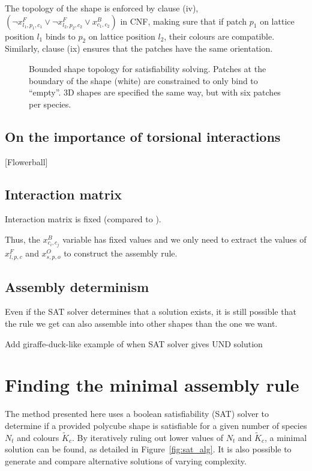 The topology of the shape is enforced by clause (iv), \(\left(\lnot x_{l_1, p_1, c_1}^{F} \lor \lnot x_{l_2, p_2, c_2}^{F} \lor x_{c_1, c_2}^{B}\right)\) in CNF, making sure that if patch \(p_1\) on lattice position \(l_1\) binds to \(p_2\) on lattice position \(l_2\), their colours are compatible. Similarly, clause (ix) ensures that the patches have the same orientation.


\begin{figure}[h]
    \centering
    \caption{Bounded shape topology for satisfiability solving. Patches at the boundary of the shape (white) are constrained to only bind to ``empty''. 3D shapes are specified the same way, but with six patches per species.}
    \label{fig:sat_boundary}
\end{figure}

\subsection{On the importance of torsional interactions}

[Flowerball]


\subsection{Interaction matrix}
Interaction matrix is fixed (compared to \cite{romano2020designing}).

Thus, the \(x_{c_i,c_j}^{B}\) variable has fixed values and we only need to extract the values of \(x_{l,p,c}^{F}\) and \(x_{s,p,o}^{O}\) to construct the assembly rule.

\subsection{Assembly determinism}
Even if the SAT solver determines that a solution exists, it is still possible that the rule we get can also assemble into other shapes than the one we want.

Add giraffe-duck-like example of when SAT solver gives UND solution

\section{Finding the minimal assembly rule}

The method presented here uses a boolean satisfiability (SAT) solver to determine if a provided polycube shape is satisfiable for a given number of species \(N_t\) and colours \(\widetilde{K}_c\). By iteratively ruling out lower values of \(N_t\) and \(\widetilde{K}_c\), a minimal solution can be found, as detailed in Figure~\ref{fig:sat_alg}. It is also possible to generate and compare alternative solutions of varying complexity.

